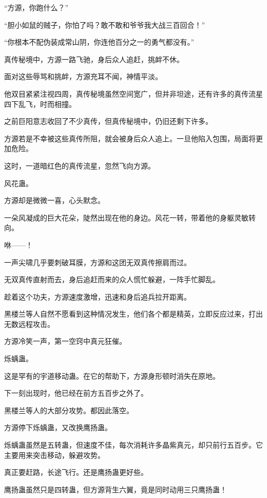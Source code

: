 
\begin{this_body}

“方源，你跑什么？”

“胆小如鼠的贼子，你怕了吗？敢不敢和爷爷我大战三百回合！”

“你根本不配伪装成常山阴，你连他百分之一的勇气都没有。”

真传秘境中，方源一路飞驰，身后众人追赶，挑衅不休。

面对这些辱骂和挑衅，方源充耳不闻，神情平淡。

他双目紧紧注视四周，真传秘境虽然空间宽广，但并非坦途，还有许多的真传流星四下乱飞，时而相撞。

之前巨阳意志收回了不少真传，但真传秘境中，仍旧还剩下许多。

方源若是不幸被这些真传所阻，就会被身后众人追上。一旦他陷入包围，局面将更加危险。

这时，一道暗红色的真传流星，忽然飞向方源。

风花蛊。

方源却是微微一喜，心头默念。

一朵风凝成的巨大花朵，陡然出现在他的身边。风花一转，带着他的身躯灵敏转向。

咻——！

一声尖啸几乎要刺破耳膜，方源和这团无双真传擦肩而过。

无双真传直射而去，身后追赶而来的众人慌忙躲避，一阵手忙脚乱。

趁着这个功夫，方源速度激增，迅速和身后追兵拉开距离。

黑楼兰等人自然不愿看到这种情况发生，他们各个都是精英，立即反应过来，打出无数远程攻击。

方源冷笑一声，第一空窍中真元狂催。

烁蝺蛊。

这是罕有的宇道移动蛊。在它的帮助下，方源身形顿时消失在原地。

下一刻出现时，他已经在前方五百步之外了。

黑楼兰等人的大部分攻势。都因此落空。

方源停下烁蝺蛊，又改换鹰扬蛊。

烁蝺蛊虽然是五转蛊，但速度不佳，每次消耗许多晶紫真元，却只前行五百步。它主要用来突击移动，躲避攻势。

真正要赶路，长途飞行。还是鹰扬蛊更好些。

鹰扬蛊虽然只是四转蛊，但方源背生六翼，竟是同时动用三只鹰扬蛊！


\end{this_body}
